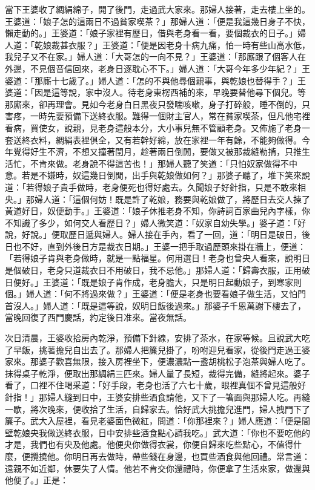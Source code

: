 \begin{showcontents}{}
當下王婆收了綢絹綿子，開了後門，走過武大家來。那婦人接著，走去樓上坐的。王婆道：「娘子怎的這兩日不過貧家喫茶？」那婦人道：「便是我這幾日身子不快，懶走動的。」王婆道：「娘子家裡有歷日，借與老身看一看，要個裁衣的日子。」婦人道：「乾娘裁甚衣服？」王婆道：「便是因老身十病九痛，怕一時有些山高水低，我兒子又不在家。」婦人道：「大哥怎的一向不見？」王婆道：「那廝跟了個客人在外邊，不見個音信回來，老身日逐耽心不下。」婦人道：「大哥今年多少年紀？」王婆道：「那廝十七歲了。」婦人道：「怎的不與他尋個親事，與乾娘也替得手？」王婆道：「因是這等說，家中沒人。待老身東楞西補的來，早晚要替他尋下個兒。等那廝來，卻再理會。見如今老身白日黑夜只發喘咳嗽，身子打碎般，睡不倒的，只害疼，一時先要預備下送終衣服。難得一個財主官人，常在貧家喫茶，但凡他宅裡看病，買使女，說親，見老身這般本分，大小事兒無不管顧老身。又佈施了老身一套送終衣料，綢絹表裡俱全，又有若幹好綿，放在家裡一年有餘，不能夠做得。今年覺得好生不濟，不想又撞著閏月，趁著兩日倒閒，要做又被那裁縫勒掯，只推生活忙，不肯來做。老身說不得這苦也！」那婦人聽了笑道：「只怕奴家做得不中意。若是不嫌時，奴這幾日倒閒，出手與乾娘做如何？」那婆子聽了，堆下笑來說道：「若得娘子貴手做時，老身便死也得好處去。久聞娘子好針指，只是不敢來相央。」那婦人道：「這個何妨！既是許了乾娘，務要與乾娘做了，將歷日去交人揀了黃道好日，奴便動手。」王婆道：「娘子休推老身不知，你詩詞百家曲兒內字樣，你不知識了多少，如何交人看歷日？」婦人微笑道：「奴家自幼失學。」婆子道：「好說，好說。」便取歷日遞與婦人。婦人接在手內，看了一回，道：「明日是破日，後日也不好，直到外後日方是裁衣日期。」王婆一把手取過歷頭來掛在牆上，便道：「若得娘子肯與老身做時，就是一點福星。何用選日！老身也曾央人看來，說明日是個破日，老身只道裁衣日不用破日，我不忌他。」那婦人道：「歸壽衣服，正用破日便好。」王婆道：「既是娘子肯作成，老身膽大，只是明日起動娘子，到寒家則個。」婦人道：「何不將過來做？」王婆道：「便是老身也要看娘子做生活，又怕門首沒人。」婦人道：「既是這等說，奴明日飯後過來。」那婆子千恩萬謝下樓去了，當晚回復了西門慶話，約定後日准來。當夜無話。

次日清晨，王婆收拾房內乾淨，預備下針線，安排了茶水，在家等候。且說武大吃了早飯，挑著擔兒自出去了。那婦人把簾兒掛了，吩咐迎兒看家，從後門走過王婆家來。那婆子歡喜無限，接入房裡坐下，便濃濃點一盞胡桃松子泡茶與婦人吃了。抹得桌子乾淨，便取出那綢絹三匹來。婦人量了長短，裁得完備，縫將起來。婆子看了，口裡不住喝采道：「好手段，老身也活了六七十歲，眼裡真個不曾見這般好針指！」那婦人縫到日中，王婆安排些酒食請他，又下了一箸面與那婦人吃。再縫一歇，將次晚來，便收拾了生活，自歸家去。恰好武大挑擔兒進門，婦人拽門下了簾子。武大入屋裡，看見老婆面色微紅，問道：「你那裡來？」婦人應道：「便是間壁乾娘央我做送終衣服，日中安排些酒食點心請我吃。」武大道：「你也不要吃他的才是，我們也有央及他處。他便央你做得衣裳，你便自歸來吃些點心，不值得什麼，便攪撓他。你明日再去做時，帶些錢在身邊，也買些酒食與他回禮。常言道：遠親不如近鄰，休要失了人情。他若不肯交你還禮時，你便拿了生活來家，做還與他便了。」正是：


\end{showcontents}
